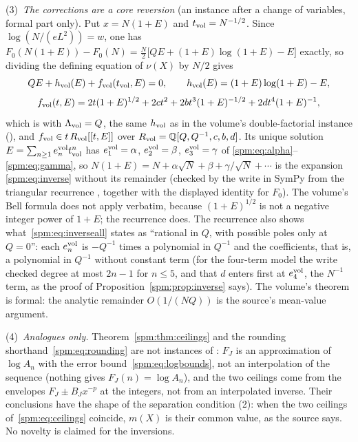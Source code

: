 \begin{remark}
(3)~\emph{The corrections are a core reversion} (an instance after a change
of variables, formal part only). Put $x=N(1+E)$ and $t_{\rm vol}=N^{-1/2}$.
Since $\log(N/(eL^2))=w$, one has
$F_0(N(1+E))-F_0(N)=\tfrac N2\bigl[QE+(1+E)\log(1+E)-E\bigr]$ exactly, so
dividing the defining equation of $\nu(X)$ by $N/2$ gives
\[
 QE+h_{\rm vol}(E)+f_{\rm vol}(t_{\rm vol},E)=0,\qquad
 h_{\rm vol}(E)=(1+E)\log(1+E)-E,
\]
\[
 f_{\rm vol}(t,E)=2t(1+E)^{1/2}+2ct^2+2bt^3(1+E)^{-1/2}+2dt^4(1+E)^{-1},
\]
which is  with $\Lambda_{\rm vol}=Q$, the same
$h_{\rm vol}$ as in the volume's double-factorial instance
(), and $f_{\rm vol}\in t\,R_{\rm vol}[[t,E]]$
over $R_{\rm vol}=\mathbb Q[Q,Q^{-1},c,b,d]$. Its unique solution
$E=\sum_{n\ge1}e_n^{\rm vol}t_{\rm vol}^n$ has $e_1^{\rm vol}=\alpha$,
$e_2^{\rm vol}=\beta$, $e_3^{\rm vol}=\gamma$ of
\eqref{spm:eq:alpha}--\eqref{spm:eq:gamma}, so
$N(1+E)=N+\alpha\sqrt N+\beta+\gamma/\sqrt N+\cdots$ is the expansion
\eqref{spm:eq:inverse} without its remainder (checked by the write in
SymPy from the triangular recurrence , together
with the displayed identity for $F_0$). The volume's Bell formula
 does not apply verbatim, because $(1+E)^{1/2}$ is not
a negative integer power of $1+E$; the recurrence does. The recurrence also
shows what~\eqref{spm:eq:inverseall} states as ``rational in $Q$, with
possible poles only at $Q=0$'': each $e_n^{\rm vol}$ is $-Q^{-1}$ times a
polynomial in $Q^{-1}$ and the coefficients, that is, a polynomial in
$Q^{-1}$ without constant term (for the four-term model the write checked
degree at most $2n-1$ for $n\le5$, and that $d$ enters first at
$e_4^{\rm vol}$, the $N^{-1}$ term, as the proof of
Proposition~\ref{spm:prop:inverse} says). The volume's theorem is formal:
the analytic remainder $O(1/(NQ))$ is the source's mean-value argument.

(4)~\emph{Analogues only.} Theorem~\ref{spm:thm:ceilings} and the rounding
shorthand~\eqref{spm:eq:rounding} are not instances of
: $F_J$ is an approximation of $\log A_n$ with the
error bound~\eqref{spm:eq:logbounds}, not an interpolation of the sequence
(nothing gives $F_J(n)=\log A_n$), and the two ceilings come from the
envelopes $F_J\pm B_Jx^{-p}$ at the integers, not from an interpolated
inverse. Their conclusions have the shape of the separation condition
(2): when the two ceilings of~\eqref{spm:eq:ceilings}
coincide, $m(X)$ is their common value, as the source says. No novelty is
claimed for the inversions.
\end{remark}
